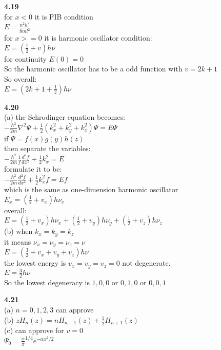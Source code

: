 \documentclass{article}
\begin{document}
\textbf{4.19}\\
for $x < 0$ it is PIB condition\\
$E = \frac{n^2h^2}{8ml^2}$\\
for $x >= 0$ it is harmonic oscillator condition:\\
$E = (\frac{1}{2} + v)h\nu$\\
for continuity $E(0) = 0$\\
So the harmonic oscillator has to be a odd function with $v = 2k + 1$\\
So overall:\\
$E = (2k+1 + \frac{1}{2})h\nu$\\
\newline

\textbf{4.20}\\
(a) the Schrodinger equation becomes:\\
$-\frac{\hbar^2}{2m}\nabla^2\Psi + \frac{1}{2}(k_x^2+k_y^2+k_z^2)\Psi = E\Psi$\\
if $\Psi = f(x)g(y)h(z)$\\
then separate the variables:\\
$-\frac{\hbar^2}{2m}\frac{1}{f}\frac{d^2f}{dx^2} + \frac{1}{2}k_x^2 = E$\\
formulate it to be:\\
$-\frac{\hbar^2}{2m}\frac{d^2f}{dx^2} + \frac{1}{2}k_x^2f = Ef$\\
which is the same as one-dimension harmonic oscillator\\
$E_x = (\frac{1}{2} + v_x)h\nu_x$\\
overall:\\
$E = (\frac{1}{2} + v_x)h\nu_x + (\frac{1}{2} + v_y)h\nu_y + (\frac{1}{2} + v_z)h\nu_z$\\
(b) when $k_x = k_y = k_z$\\
it means $\nu_x = \nu_y = \nu_z = \nu$\\
$E = (\frac{3}{2} + v_x + v_y + v_z)h\nu$\\
the lowest energy is $v_x = v_y = v_z = 0$ not degenerate.\\
$E = \frac{3}{2}h\nu$\\
So the lowest degeneracy is $1,0,0$ or $0,1,0$ or $0,0,1$\\
\newline

\textbf{4.21}\\
(a) $n = 0,1,2,3$ can approve\\
(b) $zH_{n}(z) = nH_{n - 1}(z)+ \frac{1}{2}H_{n+1}(z)$\\
(c) can approve for $v = 0$\\
$\Psi_0 = \frac{\alpha}{\pi}^{1/4}e^{-\alpha x^2/2}$\\
\newline
\end{document}
